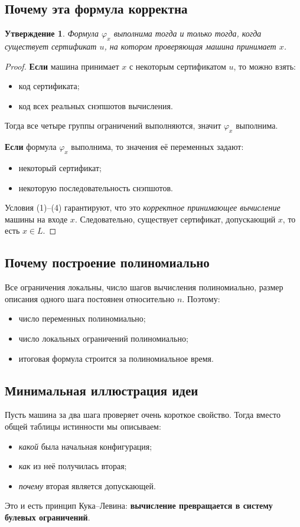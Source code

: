 \documentclass[12pt,a4paper]{article}
\theoremstyle{definition}
\theoremstyle{plain}
\newtheorem{proposition}{Утверждение}[section]
\begin{document}
\subsection{Почему эта формула корректна}
\begin{proposition}
Формула $\varphi_x$ выполнима тогда и только тогда, когда существует сертификат $u$, на котором проверяющая машина принимает $x$.
\end{proposition}

\begin{proof}
\textbf{Если} машина принимает $x$ с некоторым сертификатом $u$, то можно взять:
\begin{itemize}
\item код сертификата;
\item код всех реальных снэпшотов вычисления.
\end{itemize}
Тогда все четыре группы ограничений выполняются, значит $\varphi_x$ выполнима.

\medskip
\noindent
\textbf{Если} формула $\varphi_x$ выполнима, то значения её переменных задают:
\begin{itemize}
\item некоторый сертификат;
\item некоторую последовательность снэпшотов.
\end{itemize}
Условия (1)--(4) гарантируют, что это \emph{корректное принимающее вычисление} машины на входе $x$. Следовательно, существует сертификат, допускающий $x$, то есть $x\in L$.
\end{proof}

\subsection{Почему построение полиномиально}
Все ограничения локальны, число шагов вычисления полиномиально, размер описания одного шага постоянен относительно $n$. Поэтому:
\begin{itemize}
\item число переменных полиномиально;
\item число локальных ограничений полиномиально;
\item итоговая формула строится за полиномиальное время.
\end{itemize}

\subsection{Минимальная иллюстрация идеи}
Пусть машина за два шага проверяет очень короткое свойство. Тогда вместо общей таблицы истинности мы описываем:
\begin{itemize}
\item \emph{какой} была начальная конфигурация;
\item \emph{как} из неё получилась вторая;
\item \emph{почему} вторая является допускающей.
\end{itemize}
Это и есть принцип Кука--Левина: \textbf{вычисление превращается в систему булевых ограничений}.
\end{document}
